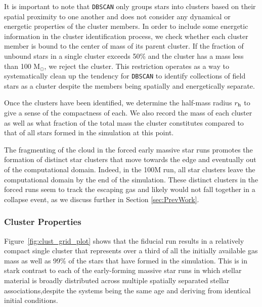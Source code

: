 \documentclass[twoside]{drexel-thesis}
\begin{document}
\begin{thesis}
It is important to note that \texttt{DBSCAN} only groups stars into clusters based on their spatial proximity to one another and does not consider any dynamical or energetic properties of the cluster members.
In order to include some energetic information in the cluster identification process, we check whether each cluster member is bound to the center of mass of its parent cluster. If the fraction of unbound stars in a single cluster exceeds 50\% and the cluster has a mass less than 100 M$_\odot$, we reject the cluster. This restriction operates as a way to systematically clean up the tendency for \texttt{DBSCAN} to identify collections of field stars as a cluster despite the members being spatially and energetically separate. 

Once the clusters have been identified, we determine the half-mass radius $r_{\rm h}$ to give a sense of the compactness of each. We also record the mass of each cluster as well as what fraction of the total mass the cluster constitutes compared to that of all stars formed in the simulation at this point. 

The fragmenting of the cloud in the forced early massive star runs promotes the formation of distinct star clusters that move towards the edge and eventually out of the computational domain. Indeed, in the 100M run, all star clusters leave the computational domain by the end of the simulation. These distinct clusters in the forced runs seem to track the escaping gas and likely would not fall together in a collapse event, as we discuss further in Section \ref{sec:PrevWork}. 

\subsubsection{Cluster Properties}
Figure~\ref{fig:clust_grid_plot} shows that the fiducial run results in a relatively compact single cluster that represents over a third of all the initially available gas mass as well as 99\% of the stars that have formed in the simulation. This is in stark contrast to each of the early-forming massive star runs in which stellar material is broadly distributed across multiple spatially separated stellar associations,despite the systems being the same age and deriving from identical initial conditions. 
  

\end{thesis}
\end{document}
